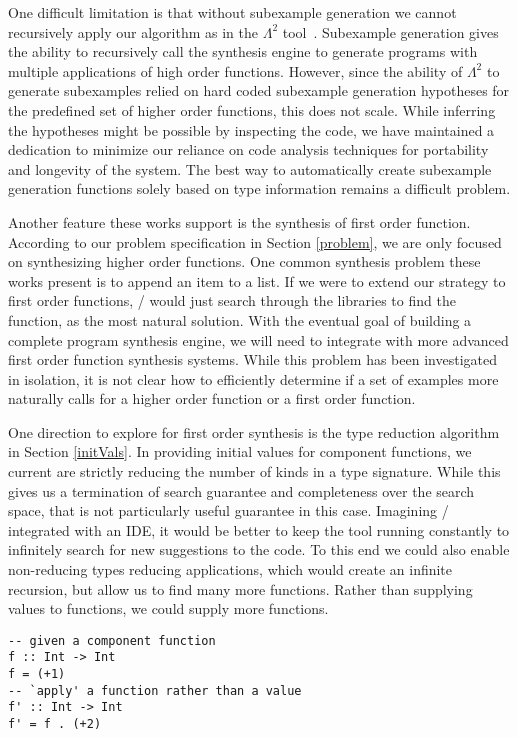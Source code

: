 One difficult limitation is that without subexample generation we cannot recursively apply our algorithm as in the $\Lambda^2$ tool~\cite{Feser:2015}.
Subexample generation gives the ability to recursively call the synthesis engine to generate programs with multiple applications of high order functions.
However, since the ability of $\Lambda^2$ to generate subexamples relied on hard coded subexample generation hypotheses for the predefined set of higher order functions, this does not scale.
While inferring the hypotheses might be possible by inspecting the code, we have maintained a dedication to minimize our reliance on code analysis techniques for portability and longevity of the system.
The best way to automatically create subexample generation functions solely based on type information remains a difficult problem.

Another feature these works support is the synthesis of first order function.
According to our problem specification in Section \ref{problem}, we are only focused on synthesizing higher order functions.
One common synthesis problem these works present is to append an item to a list.
If we were to extend our strategy to first order functions, \ourTool/ would just search through the libraries to find the  function, as the most natural solution.
With the eventual goal of building a complete program synthesis engine, we will need to integrate with more advanced first order function synthesis systems.
While this problem has been investigated in isolation, it is not clear how to efficiently determine if a set of examples more naturally calls for a higher order function or a first order function.


One direction to explore for first order synthesis is the type reduction algorithm in Section \ref{initVals}.
In providing initial values for component functions, we current are strictly reducing the number of kinds in a type signature.
While this gives us a termination of search guarantee and completeness over the search space, that is not particularly useful guarantee in this case.
Imagining \ourTool/ integrated with an IDE, it would be better to keep the tool running constantly to infinitely search for new suggestions to the code.
To this end we could also enable non-reducing types reducing applications, which would create an infinite recursion, but allow us to find many more functions.
Rather than supplying values to functions, we could supply more functions.

\begin{lstlisting}[numbers=none]
-- given a component function
f :: Int -> Int
f = (+1)
-- `apply' a function rather than a value
f' :: Int -> Int
f' = f . (+2)

\end{lstlisting}



